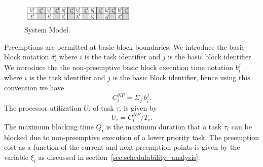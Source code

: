 \vspace{-5pt}
\begin{figure}[h!]
\begin{center}
\includegraphics[width=0.5\textwidth]{system_model.png}
\caption{System Model.}
\label{fig:system_model}
\end{center}
\vspace{-10pt}
\end{figure}
\noindent
Preemptions are permitted at basic block boundaries.  We introduce the basic block notation \begin{math}\delta_{i}^{j}\end{math} where $i$ is the task identifier and $j$ is the basic block identifier. We introduce the the non-preemptive basic block execution time notation \begin{math}b_{i}^{j}\end{math} where $i$ is the task identifier and $j$ is the basic block identifier, hence using this convention we have
\begin{equation}\label{eqn:c-np2}
    C_{i}^{NP} = \Sigma_{j}\ b_{i}^{j}.
\end{equation}
\noindent
The processor utilization \begin{math}U_{i}\end{math} of task \begin{math}\tau_{i}\end{math} is given by
\begin{equation}\label{eqn:u-task}
    U_{i} = C_{i}^{NP}/T_{i}.
\end{equation}
\noindent
The maximum blocking time $Q_i$ is the maximum duration that a task $\tau_i$ can be blocked due to non-preemptive execution of a lower priority task. The preemption cost as a function of the current
and next preemption points is given by the variable $\xi_{i}$ as discussed in section~\ref{sec:schedulability_analysis}.  
